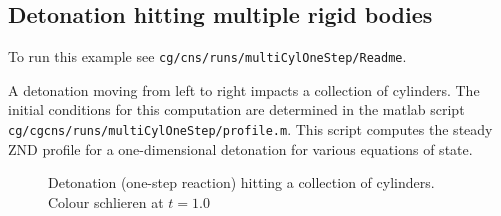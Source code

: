 \newcommand{\Gos}{\Gc_{\rm os}}%
\subsection{Detonation hitting multiple rigid bodies}\label{sec:detMultiCyl}

To run this example see {\tt cg/cns/runs/multiCylOneStep/Readme}.

A detonation moving from left to right impacts a collection of cylinders.
The initial conditions for this computation are determined in the matlab script {\tt cg/cgcns/runs/multiCylOneStep/profile.m}.
This script computes the steady ZND profile for a one-dimensional detonation for various equations of state.


{
% 
\newcommand{\figWidth}{12cm}
\newcommand{\trimfig}[2]{\trimFig{#1}{#2}{.05}{.05}{.24}{.28}}
% 
\begin{figure}[htb]
\begin{center}
\end{center}
  \caption{Detonation (one-step reaction) hitting a collection of cylinders. Colour schlieren at $t=1.0$}
  \label{fig:shockMultiCylOneStep}
\end{figure}
}



